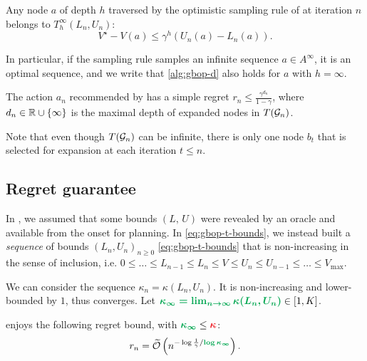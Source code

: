 \documentclass[runningheads]{llncs}
\begin{document}
\begin{lemma}[Expansion]
	\label{lem:expansion-bound}
	Any node $a$ of depth $h$ traversed by the optimistic sampling rule of \GBOPD at iteration $n$ belongs to $T_h^\infty(L_n, U_n)$: 
	\begin{equation}
	\label{eq:expansion-regret}
	V^\star-V(a) \leq \gamma^h(U_n(a)-L_n(a)).
	\end{equation}
	
	In particular, if the sampling rule samples an infinite sequence $a\in A^\infty$, it is an optimal sequence, and we write that \eqref{alg:gbop-d} also holds for $a$ with $h=\infty$.
\end{lemma}


\begin{lemma}[Recommendation]
	\label{lem:recommendation-bound}
	The action $a_n$ recommended by \GBOPD has a simple regret $r_n \leq \frac{\gamma^{d_n}}{1-\gamma}$, where $d_n\in\mathbb{R}\cup\{\infty\}$ is the maximal depth of expanded nodes in $T(\mathcal{G}_n)$.
\end{lemma}
Note that even though $T(\mathcal{G}_n)$ can be infinite, there is only one node $b_t$ that is selected for expansion at each iteration $t\leq n$.

\subsection{Regret guarantee}

In , we assumed that some bounds $(L,\,U)$ were revealed by an oracle and available from the onset for planning. In \eqref{eq:gbop-t-bounds}, we instead built a \emph{sequence} of bounds $(L_n,U_n)_{n\geq 0}$ \eqref{eq:gbop-t-bounds} that is non-increasing in the sense of inclusion, i.e. $0\leq \dots\leq L_{n-1}\leq L_n\leq V\leq U_n\leq U_{n-1}\leq \dots\leq V_{\max}$.

We can consider the sequence $\kappa_n = \kappa(L_n, U_n)$. It is non-increasing and lower-bounded by $1$, thus converges. Let $\hlgb{\kappa_\infty = \lim_{n\rightarrow\infty} \kappa(L_n, U_n)} \in[1,K]$.

\begin{theorem}
\label{thm:regret-gbop}
\GBOPD enjoys the following regret bound, with $\hlgb{\kappa_\infty} \leq \hlrb{\kappa}$: 
\begin{align*}
r_n = \tilde{\cO}\left(n^{-\log \frac{1}{\gamma}/\hlgb{\log \kappa_\infty}}\right).
\end{align*}
\end{theorem}
\end{document}
